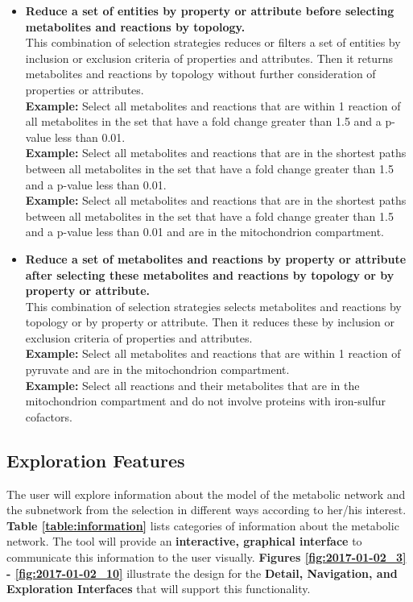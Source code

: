 \begin{enumerate}
\begin{itemize}
\item \textbf{Reduce a set of entities by property or attribute before selecting metabolites and reactions by topology.}
\\ This combination of selection strategies reduces or filters a set of entities by inclusion or exclusion criteria of properties and attributes.
Then it returns metabolites and reactions by topology without further consideration of properties or attributes.
\\ \textbf{Example:} Select all metabolites and reactions that are within 1 reaction of all metabolites in the set that have a fold change greater than 1.5 and a p-value less than 0.01.
\\ \textbf{Example:} Select all metabolites and reactions that are in the shortest paths between all metabolites in the set that have a fold change greater than 1.5 and a p-value less than 0.01.
\\ \textbf{Example:} Select all metabolites and reactions that are in the shortest paths between all metabolites in the set that have a fold change greater than 1.5 and a p-value less than 0.01 and are in the mitochondrion compartment.

\item \textbf{Reduce a set of metabolites and reactions by property or attribute after selecting these metabolites and reactions by topology or by property or attribute.}
\\ This combination of selection strategies selects metabolites and reactions by topology or by property or attribute.
Then it reduces these by inclusion or exclusion criteria of properties and attributes.
\\ \textbf{Example:} Select all metabolites and reactions that are within 1 reaction of pyruvate and are in the mitochondrion compartment.
\\ \textbf{Example:} Select all reactions and their metabolites that are in the mitochondrion compartment and do not involve proteins with iron-sulfur cofactors.

\end{itemize}

\end{enumerate}



\subsection{Exploration Features}
The user will explore information about the model of the metabolic network and the subnetwork from the selection in different ways according to her/his interest.
\textbf{Table \ref{table:information}} lists categories of information about the metabolic network.
The tool will provide an \textbf{interactive, graphical interface} to communicate this information to the user visually.
\textbf{Figures \ref{fig:2017-01-02_3} - \ref{fig:2017-01-02_10}} illustrate the design for the \textbf{Detail, Navigation, and Exploration Interfaces} that will support this functionality.

